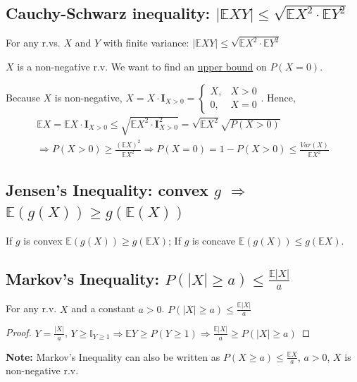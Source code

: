 \documentclass[11pt]{elegantbook}
\begin{document}
\subsection{Cauchy-Schwarz inequality: $|\mathbb{E}XY|\leq \sqrt{\mathbb{E}X^2\cdot \mathbb{E}Y^2}$}
For any r.vs. $X$ and $Y$ with finite variance: $|\mathbb{E}XY|\leq \sqrt{\mathbb{E}X^2\cdot \mathbb{E}Y^2}$
\begin{example}
$X$ is a non-negative r.v. We want to find an \underline{upper bound} on $P(X=0)$.
\end{example}
Because $X$ is non-negative, $X=X\cdot \textbf{I}_{X>0}=\left\{\begin{matrix}
    X,&X>0\\
    0,&X=0
\end{matrix}\right.$. Hence,
\begin{equation}
    \begin{aligned}
        \mathbb{E}X= \mathbb{E}X\cdot \textbf{I}_{X>0}\leq \sqrt{\mathbb{E} X^2\cdot \textbf{I}^2_{X>0}}=\sqrt{\mathbb{E}X^2}\sqrt{P(X>0)}\\
        \Rightarrow P(X>0)\geq\frac{(\mathbb{E}X)^2}{\mathbb{E}X^2} \Rightarrow P(X=0)=1-P(X>0)\leq \frac{Var(X)}{\mathbb{E}X^2}
    \end{aligned}
    \nonumber
\end{equation}

\subsection{Jensen's Inequality: convex $g$ $\Rightarrow$ $\mathbb{E}(g(X))\geq g(\mathbb{E}(X))$}
\begin{theorem}\label{Jen_in}
    If $g$ is convex $\mathbb{E}(g(X))\geq g(\mathbb{E}X)$; If $g$ is concave $\mathbb{E}(g(X))\leq g(\mathbb{E}X)$.
\end{theorem}

\subsection{Markov's Inequality: $P(|X|\geq a)\leq \frac{\mathbb{E}|X|}{a}$}
For any r.v. $X$ and a constant $a>0$. $P(|X|\geq a)\leq \frac{\mathbb{E}|X|}{a}$
\begin{proof}
$Y=\frac{|X|}{a}$, $Y\geq \mathbb{I}_{Y\geq 1} \Rightarrow \mathbb{E}Y\geq P(Y\geq 1) \Rightarrow \frac{\mathbb{E}|X|}{a}\geq P(|X|\geq a)$
\end{proof}
\textbf{Note:} Markov's Inequality can also be written as $P(X\geq a)\leq \frac{\mathbb{E}X}{a}$, $a>0$, $X$ is non-negative r.v.
\end{document}

